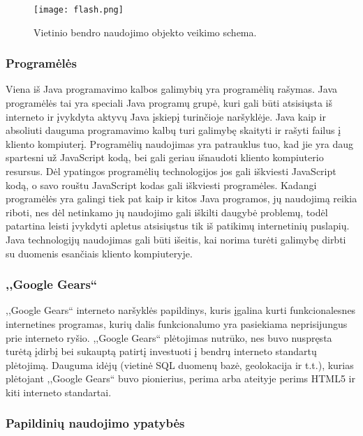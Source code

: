 \documentclass[12pt,a4paper,titlepage]{article}
\begin{document}
\begin{figure}[htb]
\begin{center}
\leavevmode
\texttt{[image: flash.png]}
\end{center}
\caption{Vietinio bendro naudojimo objekto veikimo schema.}
\label{fig:flash}
\end{figure}

\subsubsection{Programėlės}

Viena iš Java programavimo kalbos galimybių yra programėlių\cite{WJP01} rašymas. Java programėlės tai yra speciali Java programų grupė, kuri gali būti atsisiųsta iš interneto ir įvykdyta aktyvų Java įskiepį turinčioje naršyklėje. Java kaip ir absoliuti dauguma programavimo kalbų turi galimybę skaityti ir rašyti failus į kliento kompiuterį. Programėlių naudojimas yra patrauklus tuo, kad jie yra daug spartesni už JavaScript kodą, bei gali geriau išnaudoti kliento kompiuterio resursus. Dėl ypatingos programėlių technologijos jos gali iškviesti JavaScript kodą, o savo rouštu JavaScript kodas gali iškviesti programėles. Kadangi programėlės yra galingi tiek pat kaip ir kitos Java programos, jų naudojimą reikia riboti, nes dėl netinkamo jų naudojimo gali iškilti daugybė problemų, todėl patartina leisti įvykdyti apletus atsisiųstus tik iš patikimų internetinių puslapių. Java technologijų naudojimas gali būti išeitis, kai norima turėti galimybę dirbti su duomenis esančiais kliento kompiuteryje.

\subsubsection{,,Google Gears``}

,,Google Gears``\cite{STG11} interneto naršyklės papildinys, kuris įgalina kurti funkcionalesnes internetines programas, kurių dalis funkcionalumo yra pasiekiama neprisijungus prie interneto ryšio.
,,Google Gears`` plėtojimas nutrūko, nes buvo nuspręsta turėtą įdirbį bei sukauptą patirtį investuoti į bendrų interneto standartų plėtojimą. Dauguma idėjų (vietinė SQL duomenų bazė, geolokacija ir t.t.), kurias plėtojant ,,Google Gears`` buvo pionierius, perima arba ateityje perims HTML5 ir kiti interneto standartai.

\subsubsection{Papildinių naudojimo ypatybės}
\end{document}
